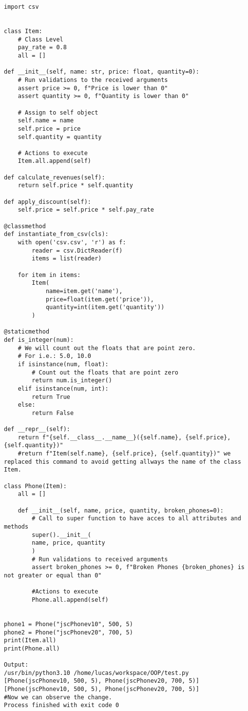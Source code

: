 \documentclass{article}
\begin{document}
\begin{lstlisting}
import csv


class Item:
	# Class Level
	pay_rate = 0.8
	all = []
	
def __init__(self, name: str, price: float, quantity=0):
	# Run validations to the received arguments
	assert price >= 0, f"Price is lower than 0"
	assert quantity >= 0, f"Quantity is lower than 0"
	
	# Assign to self object
	self.name = name
	self.price = price
	self.quantity = quantity
	
	# Actions to execute
	Item.all.append(self)
	
def calculate_revenues(self):
	return self.price * self.quantity

def apply_discount(self):
	self.price = self.price * self.pay_rate

@classmethod
def instantiate_from_csv(cls):
	with open('csv.csv', 'r') as f:
		reader = csv.DictReader(f)
		items = list(reader)
	
	for item in items:
		Item(
			name=item.get('name'),
			price=float(item.get('price')),
			quantity=int(item.get('quantity'))
		)
	
@staticmethod
def is_integer(num):
	# We will count out the floats that are point zero.
	# For i.e.: 5.0, 10.0
	if isinstance(num, float):
		# Count out the floats that are point zero
		return num.is_integer()
	elif isinstance(num, int):
		return True
	else:
		return False
	
def __repr__(self):
	return f"{self.__class__.__name__}({self.name}, {self.price}, {self.quantity})"
	#return f"Item(self.name}, {self.price}, {self.quantity})" we replaced this command to avoid getting allways the name of the class Item.

class Phone(Item):
	all = []
	
	def __init__(self, name, price, quantity, broken_phones=0):
		# Call to super function to have acces to all attributes and methods
		super().__init__(
		name, price, quantity
		)
		# Run validations to received arguments
		assert broken_phones >= 0, f"Broken Phones {broken_phones} is not greater or equal than 0"
		
		#Actions to execute
		Phone.all.append(self)


phone1 = Phone("jscPhonev10", 500, 5)
phone2 = Phone("jscPhonev20", 700, 5)
print(Item.all)
print(Phone.all)

Output:
/usr/bin/python3.10 /home/lucas/workspace/OOP/test.py 
[Phone(jscPhonev10, 500, 5), Phone(jscPhonev20, 700, 5)] 
[Phone(jscPhonev10, 500, 5), Phone(jscPhonev20, 700, 5)] 
#Now we can observe the change.
Process finished with exit code 0

\end{lstlisting}
\end{document}
